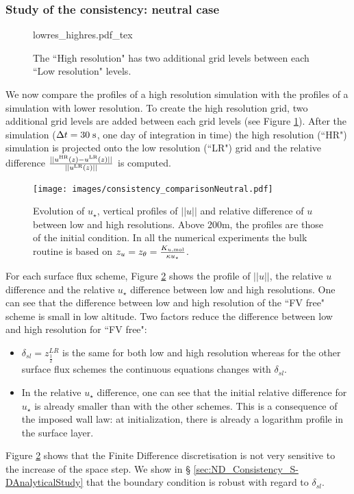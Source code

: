 \subsubsection{Study of the consistency: neutral case}
\begin{figure}
	\centering
	{lowres_highres.pdf_tex}
	\caption{The ``High resolution" has two additional grid levels
	between each ``Low resolution" levels.}
	\label{fig:ND_Consistency_lowres_highres}
\end{figure}
We now compare the profiles of a high
resolution simulation with the profiles
of a simulation with lower resolution. To create the high resolution grid,
two additional grid levels are added between each grid levels
(see Figure \ref{fig:ND_Consistency_lowres_highres}).
After the simulation ($\Delta t=30\;{\rm s}$,
one day of integration in time) the high resolution (``HR") simulation
is projected onto the low resolution (``LR") grid and the relative difference
$\frac{||u^{\rm HR}(z) - u^{\rm LR}(z)||}{||u^{\rm LR}(z)||}$ is
computed.
\begin{figure}
	\centering
	\texttt{[image: images/consistency\_comparisonNeutral.pdf]}
	\caption{ Evolution of $u_\star$, vertical profiles of $||u||$
	and relative difference of $u$ between low and high resolutions.
	Above 200m, the profiles are those of the initial condition.
	In all the numerical experiments the bulk routine is based on
	$z_u = z_\theta = \frac{K_{u, \rm mol}}{\kappa u_\star}$.
	}
	\label{fig:ND_Consistency_Neutral}
\end{figure}
For each surface flux scheme, Figure \ref{fig:ND_Consistency_Neutral}
shows the profile of $||u||$,
the relative $u$ difference and the relative $u_\star$ difference
between low and high resolutions.
One can see that the difference between low and high resolution of
the ``FV free" scheme is small in low altitude.
Two factors reduce the difference between low and high resolution
for ``FV free":
\begin{itemize}
	\item $\delta_{sl} = z_{\frac{1}{2}}^{LR}$ is the same
		for both low and high resolution whereas for
		the other surface flux schemes the continuous
		equations changes with $\delta_{sl}$.
	\item In the relative $u_\star$ difference, one can see
		that the initial relative difference for
		$u_\star$ is already smaller than with the
		other schemes. This is a consequence of the
		imposed wall law: at initialization, there
		is already a logarithm profile in the
		surface layer.
\end{itemize}
Figure \ref{fig:ND_Consistency_Neutral} shows that the
Finite Difference discretisation is not very sensitive
to the increase of the space step. We show in \S
\ref{sec:ND_Consistency_S-DAnalyticalStudy} that
the boundary condition is robust with regard to
$\delta_{sl}$.
